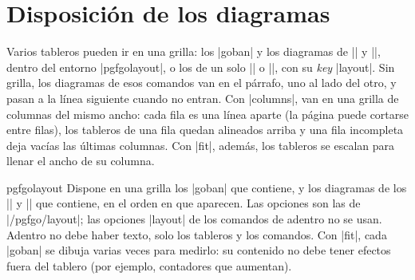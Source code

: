 \section{Disposición de los diagramas}
\label{subsec:disposicion}

Varios tableros pueden ir en una grilla: los |goban| y los diagramas de |\sgfdiagrams| y |\sgfproblem|, dentro del entorno |pgfgolayout|, o los de un solo |\sgfdiagrams| o |\sgfproblem|, con su \emph{key} |layout|. Sin grilla, los diagramas de esos comandos van en el párrafo, uno al lado del otro, y pasan a la línea siguiente cuando no entran. Con |columns|, van en una grilla de columnas del mismo ancho: cada fila es una línea aparte (la página puede cortarse entre filas), los tableros de una fila quedan alineados arriba y una fila incompleta deja vacías las últimas columnas. Con |fit|, además, los tableros se escalan para llenar el ancho de su columna.

\begin{environment}{{pgfgolayout}}
	Dispone en una grilla los |goban| que contiene, y los diagramas de los |\sgfdiagrams| y |\sgfproblem| que contiene, en el orden en que aparecen. Las opciones son las de |/pgfgo/layout|; las opciones |layout| de los comandos de adentro no se usan. Adentro no debe haber texto, solo los tableros y los comandos. Con |fit|, cada |goban| se dibuja varias veces para medirlo: su contenido no debe tener efectos fuera del tablero (por ejemplo, contadores que aumentan).

	\begin{codeexample}
		\begin{pgfgolayout}[columns = 4, fit]
			\begin{goban}[5]\end{goban}
			\begin{goban}[5]\end{goban}
		\end{pgfgolayout}
	\end{codeexample}
\end{environment}

\begin{pgfgolayout}[columns = 4, fit]
	\begin{goban}[5]\end{goban}
	\begin{goban}[5]\end{goban}
\end{pgfgolayout}

